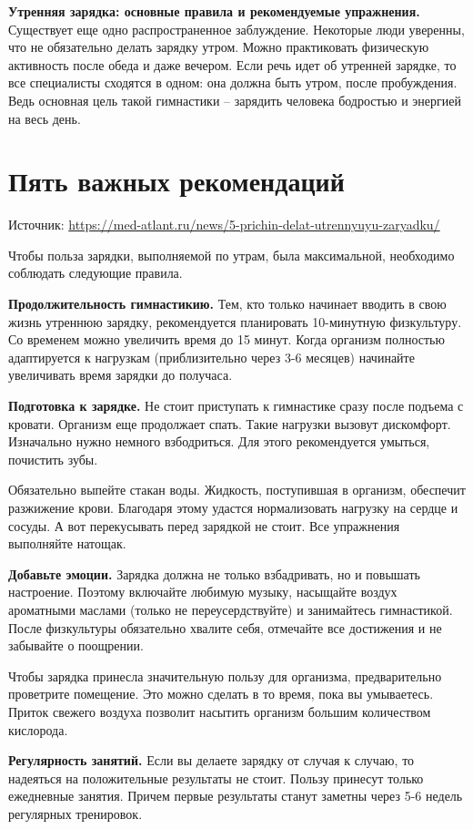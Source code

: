 \textbf{Утренняя зарядка: основные правила и рекомендуемые упражнения.} Существует еще одно распространенное заблуждение. Некоторые люди уверенны, что не обязательно делать зарядку утром. Можно практиковать физическую активность после обеда и даже вечером. Если речь идет об утренней зарядке, то все специалисты сходятся в одном: она должна быть утром, после пробуждения. Ведь основная цель такой гимнастики – зарядить человека бодростью и энергией на весь день.

\section{Пять важных рекомендаций}
Источник: \url{https://med-atlant.ru/news/5-prichin-delat-utrennyuyu-zaryadku/}

Чтобы польза зарядки, выполняемой  по утрам, была максимальной, необходимо соблюдать следующие правила.

\textbf{Продолжительность гимнастикию.} Тем, кто только начинает вводить в свою жизнь утреннюю зарядку, рекомендуется планировать 10-минутную физкультуру. Со временем можно увеличить время до 15 минут. Когда организм полностью адаптируется к нагрузкам (приблизительно через 3-6 месяцев) начинайте увеличивать время зарядки до получаса.

\textbf{Подготовка к зарядке.} Не стоит приступать к гимнастике сразу после подъема с кровати. Организм еще продолжает спать. Такие нагрузки вызовут дискомфорт. Изначально нужно немного взбодриться. Для этого рекомендуется умыться, почистить зубы.

Обязательно выпейте стакан воды. Жидкость, поступившая в организм, обеспечит разжижение крови. Благодаря этому удастся нормализовать нагрузку на сердце и сосуды. А вот перекусывать перед зарядкой не стоит. Все упражнения выполняйте натощак.

\textbf{Добавьте эмоции.} Зарядка должна не только взбадривать, но и повышать настроение. Поэтому включайте любимую музыку, насыщайте воздух ароматными маслами (только не переусердствуйте) и занимайтесь гимнастикой. После физкультуры обязательно хвалите себя, отмечайте все достижения и не забывайте о поощрении.

Чтобы зарядка принесла значительную пользу для организма, предварительно проветрите помещение. Это можно сделать в то время, пока вы умываетесь. Приток свежего воздуха позволит насытить организм большим количеством кислорода.

\textbf{Регулярность занятий.} Если вы делаете зарядку от случая к случаю, то надеяться на положительные результаты не стоит. Пользу принесут только ежедневные занятия. Причем первые результаты станут заметны через 5-6 недель регулярных тренировок.

